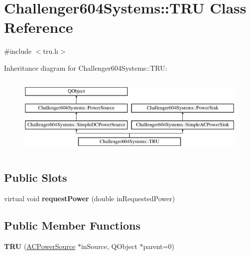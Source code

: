 \hypertarget{class_challenger604_systems_1_1_t_r_u}{\section{Challenger604\-Systems\-:\-:T\-R\-U Class Reference}
\label{class_challenger604_systems_1_1_t_r_u}
}


{\ttfamily \#include $<$tru.\-h$>$}

Inheritance diagram for Challenger604\-Systems\-:\-:T\-R\-U\-:\begin{figure}[H]
\begin{center}
\leavevmode
\includegraphics[height=3.902439cm]{class_challenger604_systems_1_1_t_r_u}
\end{center}
\end{figure}
\subsection*{Public Slots}
\begin{DoxyCompactItemize}
\item 
\hypertarget{class_challenger604_systems_1_1_t_r_u_a357a6361c26e37f21eff8da6295263a3}{virtual void {\bfseries request\-Power} (double in\-Requested\-Power)}\label{class_challenger604_systems_1_1_t_r_u_a357a6361c26e37f21eff8da6295263a3}

\end{DoxyCompactItemize}
\subsection*{Public Member Functions}
\begin{DoxyCompactItemize}
\item 
\hypertarget{class_challenger604_systems_1_1_t_r_u_a51fb2291fc0a2bfc4e057c3868ecf45b}{{\bfseries T\-R\-U} (\hyperlink{class_challenger604_systems_1_1_a_c_power_source}{A\-C\-Power\-Source} $\ast$in\-Source, Q\-Object $\ast$parent=0)}\label{class_challenger604_systems_1_1_t_r_u_a51fb2291fc0a2bfc4e057c3868ecf45b}

\end{DoxyCompactItemize}

